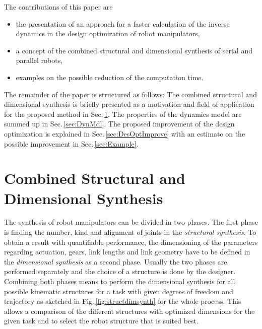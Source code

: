 \documentclass{svproc}
\begin{document}
The contributions of this paper are
\begin{itemize}
    \item the presentation of an approach for a faster calculation of the inverse dynamics in the design optimization of robot manipulators,
    \item a concept of the combined structural and dimensional synthesis of serial and parallel robots,
    \item examples on the possible reduction of the computation time.
\end{itemize}

The remainder of the paper is structured as follows:
The combined structural and dimensional synthesis is briefly presented as a motivation and field of application for the proposed method in Sec.\,\ref{sec:DimSynth}.
The properties of the dynamics model are summed up in Sec.\,\ref{sec:DynMdl}.
The proposed improvement of the design optimization is explained in Sec.\,\ref{sec:DesOptImprove} with an estimate on the possible improvement in Sec.\,\ref{sec:Example}.

\section{Combined Structural and Dimensional Synthesis}
\label{sec:DimSynth}

The synthesis of robot manipulators can be divided in two phases.
The first phase is finding the number, kind and alignment of joints in the \emph{structural synthesis}.
To obtain a result with quantifiable performance, the dimensioning of the parameters regarding actuation, gears, link lengths and link geometry have to be defined in the \emph{dimensional synthesis} as a second phase.
Usually the two phases are performed separately and the choice of a structure is done by the designer.
Combining both phases means to perform the dimensional synthesis for all possible kinematic structures for a task with given degrees of freedom and trajectory as  sketched in Fig.\,\ref{fig:structdimsynth} for the whole process.
This allows a comparison of the different structures with optimized dimensions for the given task \cite{RamirezKotOrt2015} and to select the robot structure that is suited best.
\end{document}
